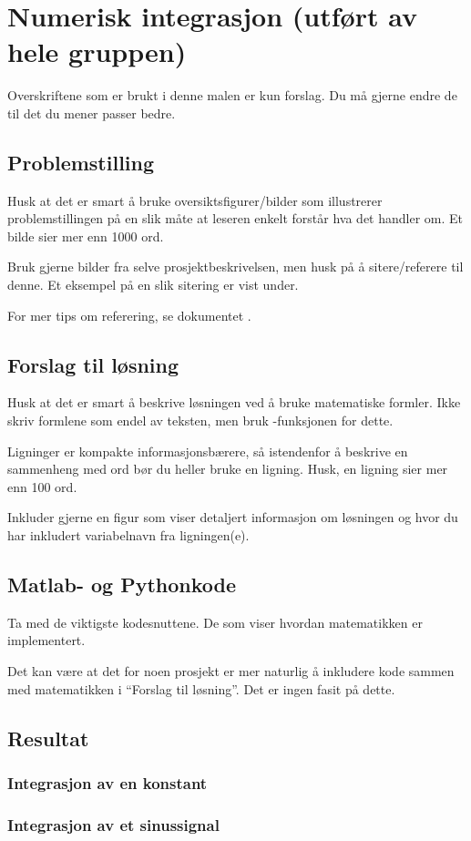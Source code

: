 \documentclass[./main.tex]{subfiles}
\begin{document}
\chapter{Numerisk integrasjon (utført av hele gruppen) }\label{kap:integrasjon}

Overskriftene som er brukt i denne malen er kun forslag. Du må gjerne
endre de til det du mener passer bedre.

\section{Problemstilling}

Husk at det er smart å bruke oversiktsfigurer/bilder som illustrerer
problemstillingen på en slik måte at leseren enkelt forstår hva det handler
om. Et bilde sier mer enn 1000 ord.

Bruk gjerne bilder fra selve prosjektbeskrivelsen, men husk på å sitere/referere
til denne. Et eksempel på en slik sitering er vist under.

For mer tips om referering, se dokumentet .

\section{Forslag til løsning}

Husk at det er smart å beskrive løsningen ved å bruke matematiske
formler. Ikke skriv formlene som endel av teksten, men bruk
-funksjonen for dette.

Ligninger er kompakte informasjonsbærere, så istendenfor å
beskrive en sammenheng med ord bør du heller bruke en ligning.
Husk, en ligning sier mer enn 100 ord.

Inkluder gjerne en figur som viser detaljert informasjon om løsningen
og hvor du har inkludert  variabelnavn fra ligningen(e).

\section{Matlab- og Pythonkode}
Ta med de viktigste kodesnuttene. De som viser hvordan matematikken er
implementert.

Det kan være at det for noen prosjekt er mer naturlig å inkludere kode
sammen med matematikken i ``Forslag til løsning''. Det er ingen fasit
på dette.

\section{Resultat}

\subsection{Integrasjon av en konstant}

\subsection{Integrasjon av et sinussignal}
\end{document}
